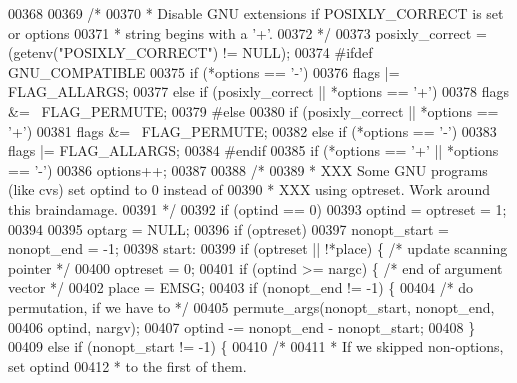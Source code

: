 \begin{DoxyCode}
{{{{{{{{{{{00368 
00369     \textcolor{comment}{/*}
00370 \textcolor{comment}{     * Disable GNU extensions if POSIXLY\_CORRECT is set or options}
00371 \textcolor{comment}{     * string begins with a '+'.}
00372 \textcolor{comment}{     */}
00373     posixly\_correct = (getenv(\textcolor{stringliteral}{"POSIXLY\_CORRECT"}) != NULL);
00374 \textcolor{preprocessor}{#ifdef GNU\_COMPATIBLE}
00375     \textcolor{keywordflow}{if} (*options == \textcolor{charliteral}{'-'})
00376         flags |= FLAG\_ALLARGS;
00377     \textcolor{keywordflow}{else} \textcolor{keywordflow}{if} (posixly\_correct || *options == \textcolor{charliteral}{'+'})
00378         flags &= ~FLAG\_PERMUTE;
00379 \textcolor{preprocessor}{#else}
00380     \textcolor{keywordflow}{if} (posixly\_correct || *options == \textcolor{charliteral}{'+'})
00381         flags &= ~FLAG\_PERMUTE;
00382     \textcolor{keywordflow}{else} \textcolor{keywordflow}{if} (*options == \textcolor{charliteral}{'-'})
00383         flags |= FLAG\_ALLARGS;
00384 \textcolor{preprocessor}{#endif}
00385     \textcolor{keywordflow}{if} (*options == \textcolor{charliteral}{'+'} || *options == \textcolor{charliteral}{'-'})
00386         options++;
00387 
00388     \textcolor{comment}{/*}
00389 \textcolor{comment}{     * XXX Some GNU programs (like cvs) set optind to 0 instead of}
00390 \textcolor{comment}{     * XXX using optreset.  Work around this braindamage.}
00391 \textcolor{comment}{     */}
00392     \textcolor{keywordflow}{if} (optind == 0)
00393         optind = optreset = 1;
00394 
00395     optarg = NULL;
00396     \textcolor{keywordflow}{if} (optreset)
00397         nonopt\_start = nonopt\_end = -1;
00398 start:
00399     \textcolor{keywordflow}{if} (optreset || !*place) \{      \textcolor{comment}{/* update scanning pointer */}
00400         optreset = 0;
00401         \textcolor{keywordflow}{if} (optind >= nargc) \{          \textcolor{comment}{/* end of argument vector */}
00402             place = EMSG;
00403             \textcolor{keywordflow}{if} (nonopt\_end != -1) \{
00404                 \textcolor{comment}{/* do permutation, if we have to */}
00405                 permute\_args(nonopt\_start, nonopt\_end,
00406                     optind, nargv);
00407                 optind -= nonopt\_end - nonopt\_start;
00408             \}
00409             \textcolor{keywordflow}{else} \textcolor{keywordflow}{if} (nonopt\_start != -1) \{
00410                 \textcolor{comment}{/*}
00411 \textcolor{comment}{                 * If we skipped non-options, set optind}
00412 \textcolor{comment}{                 * to the first of them.}
}}}}}}}}}}}
\end{DoxyCode}
